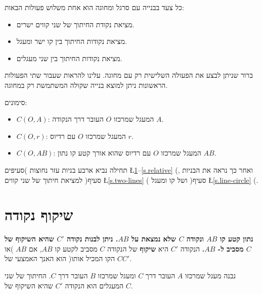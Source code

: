 כל צעד בבנייה עם סרגל ומחוגה הוא אחת משלוש פעולות הבאות:
\begin{itemize}
\item
מציאת נקודת החיתוך של שני קווים ישרים.
\item
מציאת נקודות החיתוך בין קו ישר ומעגל.
\item
מציאת נקודות החיתוך בין שני מעגלים.
\end{itemize}
ברור שניתן לבצע את הפעולה השלישית רק עם מחוגה. עלינו להראות שעבור שתי הפעולות הראשונות ניתן למוצא בנייה שקולה המשתמשת רק במחוגה.


סימונים:
\begin{itemize}
\item $C(O,A)$: 
המעגל שמרכזו
$O$
העובר דרך הנקודה
$A$.
\item $C(O,r)$:
המעגל שמרכזו
$O$
עם רדיוס
$r$.
\item $C(O,AB)$:
המעגל שמרכזו
$O$
עם רדיוס שהוא אורך קטע קו נתון
$AB$.
\end{itemize}

תחילה נביא ארבע בניות עזר נחוצות )סעיפים
\L{\ref{s.reflection}--\ref{s.relative}}%
(,
ואחר כך נראה את הבניות למציאת חיתוך של שני קווים )סעיף
\L{\ref{s.two-lines}}%
( ושל קו ומעגל )סעיף
\L{\ref{s.line-circle}}%
(.

\np

\section{%
שיקוף נקודה%
}\label{s.reflection}
\textbf{%
נתון קטע קו
$AB$
ונקודה 
$C$
שלא נמצאת על
$AB$.
ניתן לבנות נקודה 
$C'$
שהיא השיקוף של
$C$
מסביב ל-%
$AB$.
}
הנקודה
$C'$
היא
\textbf{%
שיקוף%
}
של הנקודה
$C$
מסביב לקטע קו
$AB$,
אם 
$AB$
)או הקו המכיל אותו( הוא האנך האמצעי של
$CC'$.

נבנה מעגל שמרכזו
$A$
העובר דרך
$C$
ומעגל שמרכזו
$B$
העובר דרך
$C$.
החיתוך של שני המעגלים הוא הנקודה
$C'$
שהיא השיקוף של
$C$.

\vspace{-1ex}

\begin{center}
\end{center}

